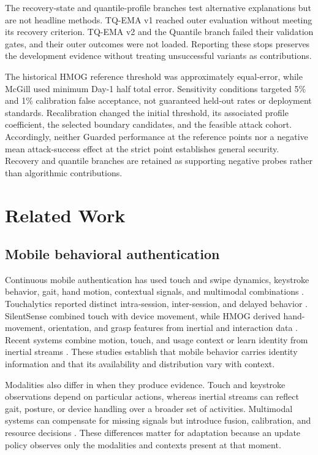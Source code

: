 \documentclass[technologies,article,submit,moreauthors]{Definitions/mdpi}
\begin{document}
The recovery-state and quantile-profile branches test alternative explanations but are not headline methods. TQ-EMA v1 reached outer evaluation without meeting its recovery criterion. TQ-EMA v2 and the Quantile branch failed their validation gates, and their outer outcomes were not loaded. Reporting these stops preserves the development evidence without treating unsuccessful variants as contributions.

The historical HMOG reference threshold was approximately equal-error, while McGill used minimum Day-1 half total error. Sensitivity conditions targeted 5\% and 1\% calibration false acceptance, not guaranteed held-out rates or deployment standards. Recalibration changed the initial threshold, its associated profile coefficient, the selected boundary candidates, and the feasible attack cohort. Accordingly, neither Guarded performance at the reference points nor a negative mean attack-success effect at the strict point establishes general security. Recovery and quantile branches are retained as supporting negative probes rather than algorithmic contributions.

\section{Related Work}\label{sec:related-work}

\subsection{Mobile behavioral authentication}\label{sec:mobile-behavioral-authentication}

Continuous mobile authentication has used touch and swipe dynamics, keystroke behavior, gait, hand motion, contextual signals, and multimodal combinations \cite{Mahfouz2017SmartphoneSurvey,Abuhamad2021SensorSurvey,Stylios2021MobileSurvey}. Touchalytics reported distinct intra-session, inter-session, and delayed behavior \cite{Frank2013Touchalytics}. SilentSense combined touch with device movement, while HMOG derived hand-movement, orientation, and grasp features from inertial and interaction data \cite{Bo2013SilentSense,Sitova2016HMOG}. Recent systems combine motion, touch, and usage context or learn identity from inertial streams \cite{Shen2022MMAuth,Fereidooni2023AuthentiSense,Jiang2024MAUTH}. These studies establish that mobile behavior carries identity information and that its availability and distribution vary with context.

Modalities also differ in when they produce evidence. Touch and keystroke observations depend on particular actions, whereas inertial streams can reflect gait, posture, or device handling over a broader set of activities. Multimodal systems can compensate for missing signals but introduce fusion, calibration, and resource decisions \cite{Ross2003InformationFusion,Shen2022MMAuth}. These differences matter for adaptation because an update policy observes only the modalities and contexts present at that moment.
\end{document}
